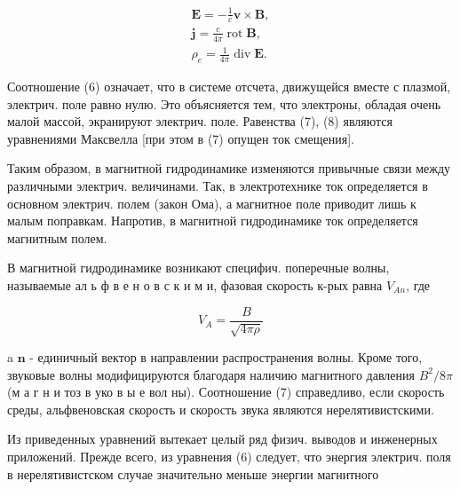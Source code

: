 \documentclass[10pt]{article}
\begin{document}
\[

\begin{gathered}

\boldsymbol{E}=-\frac{1}{c} \boldsymbol{v} \times \boldsymbol{B}, \\

\boldsymbol{j}=\frac{c}{4 \pi} \operatorname{rot} \boldsymbol{B}, \\

\rho_{e}=\frac{1}{4 \pi} \operatorname{div} \boldsymbol{E} .

\end{gathered}

\]



Соотношение (6) означает, что в системе отсчета, движущейся вместе с плазмой, электрич. поле равно нулю. Это объясняется тем, что электроны, обладая очень малой массой, экранируют электрич. поле. Равенства (7), (8) являются уравнениями Максвелла [при этом в (7) опущен ток смещения].



Таким образом, в магнитной гидродинамике изменяются привычные связи между различными электрич. величинами. Так, в электротехнике ток определяется в основном электрич. полем (закон Ома), а магнитное поле приводит лишь к малым поправкам. Напротив, в магнитной гидродинамике ток определяется магнитным полем.



В магнитной гидродинамике возникают специфич. поперечные волны, называемые ал ь ф в е н о в с к и м и, фазовая скорость к-рых равна $V_{A n}$, где



\[

V_{A}=\frac{B}{\sqrt{4 \pi \rho}}

\]



a $\boldsymbol{n}$ - единичный вектор в направлении распространения волны. Кроме того, звуковые волны модифицируются благодаря наличию магнитного давления $B^{2} / 8 \pi$ (м а г н и тоз в уко в ы е вол ны). Соотношение (7) справедливо, если скорость среды, альфвеновская скорость и скорость звука являются нерелятивистскими.



Из приведенных уравнений вытекает целый ряд физич. выводов и инженерных приложений. Прежде всего, из уравнения (6) следует, что энергия электрич. поля в нерелятивистском случае значительно меньше энергии магнитного
\end{document}
